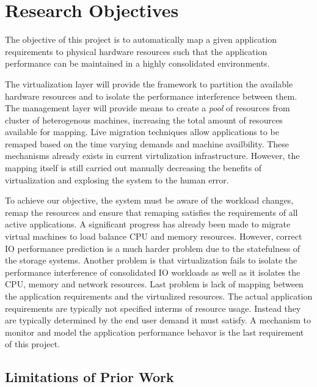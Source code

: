 \section{Research Objectives}
\label{objectives}
%
The objective of this project is to automatically map a given application requirements to physical hardware resources such that the application performance can be maintained in a highly consolidated environments. 

The virtualization layer will provide the framework to partition the available hardware resources and to isolate the performance interference between them\cite{vmware5}. 
The management layer will provide means to create a \emph{pool} of resources from cluster of heterogenous machines\cite{drs}, increasing the total amount of resources available for mapping. 
Live migration techniques\cite{nelson2005fast,clark2005live,mashtizadeh2011design} allow applications to be remaped based on the time varying demands and machine availbility. 
These mechanisms already exists in current virtulization infrastructure.
However, the mapping itself is still carried out manually decreasing the benefits of virtualization and explosing the system to the human error. 

To achieve our objective, the system must be aware of the workload changes, remap the resources and ensure that remaping satisfies the requirements of all active applications.
A significant progress has already been made to migrate virtual machines to load balance CPU and memory resources\cite{nelson2005fast, clark2005live}.
However, correct IO performance prediction is a much harder problem due to the statefulness of the storage systems\cite{basil}.
Another problem is that virtualization fails to isolate the performance interference of consolidated IO workloads as well as it isolates the CPU, memory and network resources. 
Last problem is lack of mapping between the application requirements and the virtualized resources. 
The actual application requirements are typically not specified interms of resource usage. 
Instead they are typically determined by the end user demand it must satisfy.   
A mechanism to monitor and model the application performance behavor is the last requirement of this project. 

\subsection{Limitations of Prior Work}

